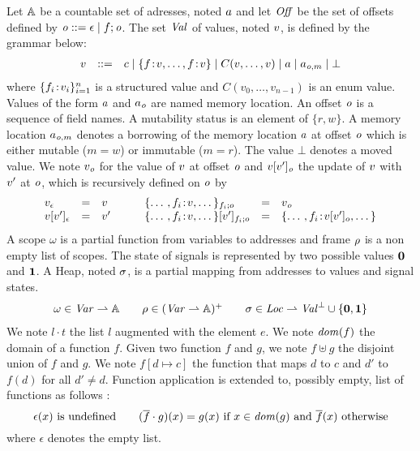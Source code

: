 Let $\mathbb{A}$ be a countable set of adresses, noted $a$ and let ${\mathit{Off}}$ be the set of offsets defined 
by ${\mathit{o}} ::= \epsilon \mid f;{\mathit{o}}$.
The set ${\mathit{Val}}{}$ of \sail{} values, noted $v{}$, is defined by the grammar below:
$$
  \begin{array}{lcl} v & ::= & c \mid \{f\!:\!v, \ldots, f\!:\!v\} \mid C(v,\ldots,v)
            \mid a \mid a_{{\mathit{o}},m} \mid \bot
  \end{array}
$$
where $\{f_i\!:\!v_i\}_{i=1}^n$ is a structured value and $C(v_0,\ldots,v_{n-1})$ is an enum value.
Values of the form $a$ and $a_{\mathit{o}}$ are named memory location.
An offset ${\mathit{o}}$ is a sequence of field names. A mutability status is an element of $\{r,w\}$.
A memory location $a_{{\mathit{o}},m}$ denotes a borrowing of the memory location $a$ at offset ${\mathit{o}}$
which is either mutable ($m=w$) or immutable ($m=r$).
The value $\bot$ denotes a moved value.
We note $v_{\mathit{o}}$ for the value of $v$ at offset ${\mathit{o}}$ and 
$v[v']_{\mathit{o}}$ the update of $v$ with $v'$ at ${\mathit{o}}$, which is recursively defined on ${\mathit{o}}$ by
$$
  \begin{array}{lcllcl}
    v_\epsilon &=& v & \qquad
    \{\dotso,f_{i}\!:\!v,\dotso\}_{f_i;o} &=&v_{\mathit{o}}\\
    v[v']_{\epsilon} &=& v' & \qquad
    \{\dotso,f_{i}\!:\!v,\dotso\}[v']_{f_i;o} &=& 
    \{\dotso,f_{i}\!:\!v[v']_o,\dotso\}
  \end{array}
$$
A scope $\omega$ is a partial function from variables to addresses and 
frame $\rho$ is a non empty list of scopes. The state of signals is represented by two possible values ${\bf{0}}$ and ${\bf{1}}$.
A Heap, noted $\sigma$, is a partial mapping from addresses to values and signal states.
$$
\begin{array}{c}
\omega \in {\mathit{Var}} \rightharpoonup \mathbb{A}  \qquad \rho \in ({\mathit{Var}} \rightharpoonup \mathbb{A})^+\qquad
\sigma \in {\mathit{Loc}} \rightharpoonup {\mathit{Val}}^\bot \cup\{{\bf{0}}, {\bf{1}}\}
\end{array}
$$
We note $l \cdot t$ the list $l$ augmented with the element $e$. 
We note ${\mathit{dom}}(f)$ the domain of a function $f$. Given two function $f$ and $g$, we note $f \uplus g$ 
the disjoint union of $f$ and $g$. We note $f[d \mapsto c]$ the function that maps $d$ to $c$ and $d'$ to $f(d)$ for all $d'\not =  d$.
Function application is extended to, possibly empty, list of functions as follows : 
$$
\epsilon(x) {\text{ is undefined}} \qquad 
(\overline{f}\cdot g)(x) = g(x) {\text{ if $x \in {\mathit{dom}}(g)$ and }} \overline{f}(x) {\text{ otherwise}}
$$ 
where $\epsilon$ denotes the empty list.
